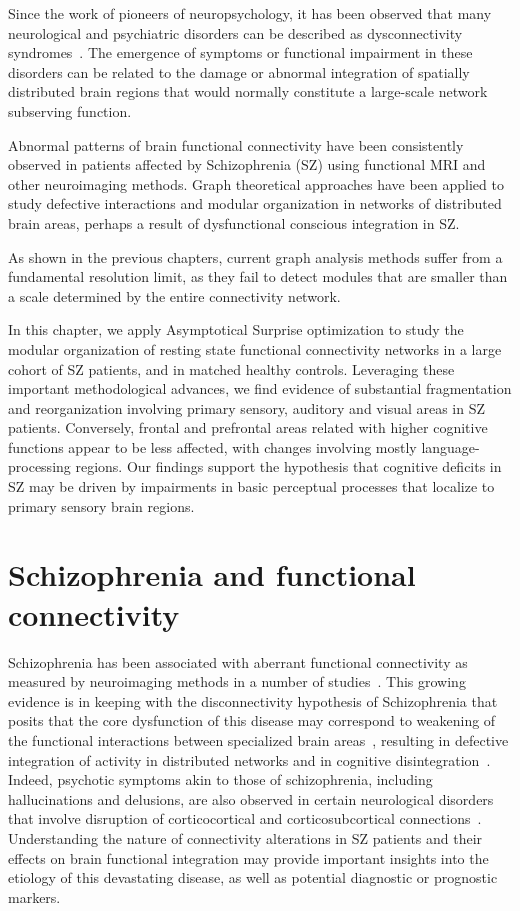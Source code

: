 Since the work of pioneers of neuropsychology, it has been observed that many neurological and psychiatric disorders can be described as dysconnectivity syndromes~\cite{catani2005}.
The emergence of symptoms or functional impairment in these disorders can be related to the damage or abnormal integration of spatially distributed brain regions that would normally constitute a large-scale network subserving function.

Abnormal patterns of brain functional connectivity have been consistently observed in patients affected by Schizophrenia (SZ) using functional MRI and other neuroimaging methods.
Graph theoretical approaches have been applied to study defective interactions and modular organization in networks of distributed brain areas, perhaps a result of dysfunctional conscious integration in SZ.

As shown in the previous chapters, current graph analysis methods suffer from a fundamental resolution limit, as they fail to detect modules that are smaller than a scale determined by the entire connectivity network.

In this chapter, we apply Asymptotical Surprise optimization to study the modular organization of resting state functional connectivity networks in a large cohort of SZ patients, and in matched healthy controls.
Leveraging these important methodological advances, we find evidence of substantial fragmentation and reorganization involving primary sensory, auditory and visual areas in SZ patients.
Conversely, frontal and prefrontal areas related with higher cognitive functions appear to be less affected, with changes involving mostly language-processing regions.
Our findings support the hypothesis that cognitive deficits in SZ may be driven by impairments in basic perceptual processes that localize to primary sensory brain regions.

\section{Schizophrenia and functional connectivity}
Schizophrenia has been associated with aberrant functional connectivity as measured by neuroimaging methods in a number of studies~\cite{friston1995,bullmore1998,liang2006,liu2008,calhoun2009,alexander-bloch2010,alexander-bloch2012,alexander-bloch2013}.
This growing evidence is in keeping with the disconnectivity hypothesis of Schizophrenia that posits that the core dysfunction of this disease may correspond to weakening of the functional interactions between specialized brain areas~\cite{ellison-wright2009,fornito2009,kubicki2005}, resulting in defective integration of activity in distributed networks and in cognitive disintegration~\cite{tononi2000}.
Indeed, psychotic symptoms akin to those of schizophrenia, including hallucinations and delusions, are also observed in certain neurological disorders that involve disruption of corticocortical and corticosubcortical connections~\cite{hyde1992}.
Understanding the nature of connectivity alterations in SZ patients and their effects on brain functional integration may provide important insights into the etiology of this devastating disease, as well as potential diagnostic or prognostic markers.

